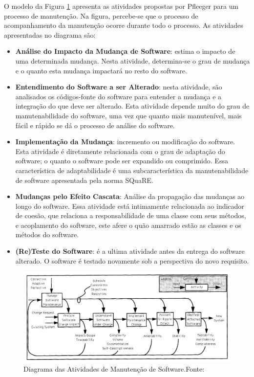 O modelo da Figura \ref{img:modelo_manutencao} apresenta as atividades propostas por Pfleeger \cite{pfleeger_framework_1990} para um processo de manutenção. Na figura, percebe-se que o processo de acompanhamento da manutenção ocorre durante todo o processo. As atividades apresentadas no diagrama são:

\begin{itemize}
\item \textbf{Análise do Impacto da Mudança de Software}: estima o impacto de uma determinada mudança. Nesta atividade, determina-se o grau de mudança e o quanto esta mudança impactará no resto do software. 
\item \textbf{Entendimento do Software a ser Alterado}: nesta atividade, são analisados os códigos-fonte do software para entender a mudança e a integração do que deve ser alterado. Esta atividade depende muito do grau de manutenabilidade do software, uma vez que quanto mais manutenível, mais fácil e rápido se dá o processo de análise do software.
\item \textbf{Implementação da Mudança}: incremento ou modificação do software. Esta atividade é diretamente relacionada com o grau de adaptação do software; o quanto o software pode ser expandido ou comprimido. Essa característica de adaptabilidade é uma subcaracterística da manutenabilidade de software apresentada pela norma SQuaRE. 
\item \textbf{Mudanças pelo Efeito Cascata}: Análise da propagação das mudanças ao longo do software. Essa atividade está intimamente relacionada ao indicador de coesão, que relaciona a responsabilidade de uma classe com seus métodos, e acoplamento do software, este afere o quão amarrado estão as classes e os métodos do software.
\item \textbf{(Re)Teste do Software}: é a ultima atividade antes da entrega do software alterado. O software é testado novamente sob a perspectiva do novo requisito.
\end{itemize}

\graphicspath{{figuras/}}
\begin{figure}[h]
\centering
\includegraphics[scale=0.50]{Manutencao}
\caption{Diagrama das Atividades de Manutenção de Software.Fonte:\cite{pfleeger_framework_1990}}
\label{img:modelo_manutencao}
\end{figure}

